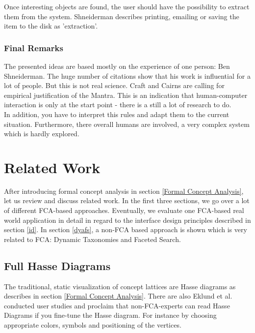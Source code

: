 \documentclass[11pt]{report}
\begin{document}
Once interesting objects are found, the user should have the possibility to extract them from the system. Shneiderman describes printing, emailing or saving the item to the disk as 'extraction'.

\subsection{Final Remarks}

The presented ideas are based mostly on the experience of one person: Ben Shneiderman. The huge number of citations show that his work is influential for a lot of people. But this is not real science. Craft and Cairns \cite{Craft2005} are calling for empirical justification of the Mantra. This is an indication that human-computer interaction is only at the start point - there is a still a lot of research to do. \\

In addition, you have to interpret this rules and adapt them to the current situation. Furthermore, there overall humans are involved, a very complex system which is hardly explored.

\chapter{Related Work} \label{Related Work}

After introducing formal concept analysis in section \ref{Formal Concept Analysis}, let us review and discuss related work. In the first three sections, we go over a lot of different FCA-based approaches. Eventually, we evaluate one FCA-based real world application in detail in regard to the interface design principles described in section \ref{id}. In section \ref{dyafs}, a non-FCA based approach is shown which is very related to FCA: Dynamic Taxonomies and Faceted Search. \\

\section{Full Hasse Diagrams}

The traditional, static visualization of concept lattices are Hasse diagrams as describes in section \ref{Formal Concept Analysis}. There are also  Eklund et al. \cite{Eklund2004} conducted user studies and proclaim that non-FCA-experts can read Hasse Diagrams if you fine-tune the Hasse diagram. For instance by choosing appropriate colors, symbols and positioning of the vertices. \\
\end{document}
